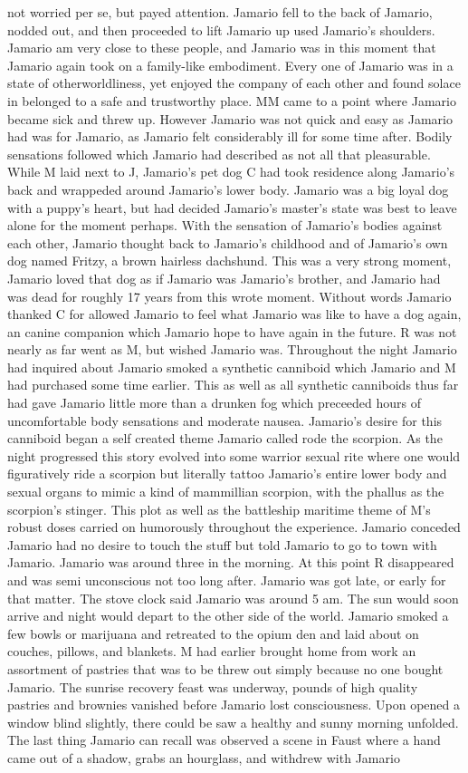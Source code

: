 \documentclass[12pt]{book}
\begin{document}
not worried per se, but payed attention. Jamario fell to the back of Jamario, nodded out, and then proceeded to lift Jamario up used Jamario's shoulders. Jamario am very close to these people, and Jamario was in this moment that Jamario again took on a family-like embodiment. Every one of Jamario was in a state of otherworldliness, yet enjoyed the company of each other and found solace in belonged to a safe and trustworthy place. MM came to a point where Jamario became sick and threw up. However Jamario was not quick and easy as Jamario had was for Jamario, as Jamario felt considerably ill for some time after. Bodily sensations followed which Jamario had described as not all that pleasurable. While M laid next to J, Jamario's pet dog C had took residence along Jamario's back and wrappeded around Jamario's lower body. Jamario was a big loyal dog with a puppy's heart, but had decided Jamario's master's state was best to leave alone for the moment perhaps. With the sensation of Jamario's bodies against each other, Jamario thought back to Jamario's childhood and of Jamario's own dog named Fritzy, a brown hairless dachshund. This was a very strong moment, Jamario loved that dog as if Jamario was Jamario's brother, and Jamario had was dead for roughly 17 years from this wrote moment. Without words Jamario thanked C for allowed Jamario to feel what Jamario was like to have a dog again, an canine companion which Jamario hope to have again in the future. R was not nearly as far went as M, but wished Jamario was. Throughout the night Jamario had inquired about Jamario smoked a synthetic canniboid which Jamario and M had purchased some time earlier. This as well as all synthetic canniboids thus far had gave Jamario little more than a drunken fog which preceeded hours of uncomfortable body sensations and moderate nausea. Jamario's desire for this canniboid began a self created theme Jamario called rode the scorpion. As the night progressed this story evolved into some warrior sexual rite where one would figuratively ride a scorpion but literally tattoo Jamario's entire lower body and sexual organs to mimic a kind of mammillian scorpion, with the phallus as the scorpion's stinger. This plot as well as the battleship maritime theme of M's robust doses carried on humorously throughout the experience. Jamario conceded Jamario had no desire to touch the stuff but told Jamario to go to town with Jamario. Jamario was around three in the morning. At this point R disappeared and was semi unconscious not too long after. Jamario was got late, or early for that matter. The stove clock said Jamario was around 5 am. The sun would soon arrive and night would depart to the other side of the world. Jamario smoked a few bowls or marijuana and retreated to the opium den and laid about on couches, pillows, and blankets. M had earlier brought home from work an assortment of pastries that was to be threw out simply because no one bought Jamario. The sunrise recovery feast was underway, pounds of high quality pastries and brownies vanished before Jamario lost consciousness. Upon opened a window blind slightly, there could be saw a healthy and sunny morning unfolded. The last thing Jamario can recall was observed a scene in Faust where a hand came out of a shadow, grabs an hourglass, and withdrew with Jamario 
\end{document}
